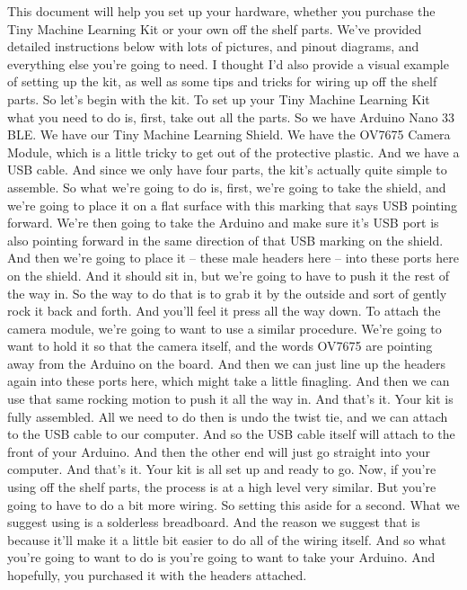 This document will help you set up your hardware, whether you purchase the Tiny Machine Learning Kit or your own off the shelf parts.
We've provided detailed instructions below with lots of pictures, and pinout diagrams, and everything else you're going to need.
I thought I'd also provide a visual example of setting up the kit, as well as some tips and tricks for wiring up off the shelf parts.
So let's begin with the kit.
To set up your Tiny Machine Learning Kit what you need to do is, first, take out all the parts.
So we have Arduino Nano 33 BLE.
We have our Tiny Machine Learning Shield.
We have the OV7675 Camera Module, which is a little tricky to get out of the protective plastic.
And we have a USB cable.
And since we only have four parts, the kit's actually quite simple to assemble.
So what we're going to do is, first, we're going to take the shield, and we're going to place it on a flat surface with this marking that says USB pointing forward.
We're then going to take the Arduino and make sure it's USB port is also pointing forward in the same direction of that USB marking on the shield.
And then we're going to place it -- these male headers here -- into these ports here on the shield.
And it should sit in, but we're going to have to push it the rest of the way in.
So the way to do that is to grab it by the outside and sort of gently rock it back and forth.
And you'll feel it press all the way down.
To attach the camera module, we're going to want to use a similar procedure.
We're going to want to hold it so that the camera itself, and the words OV7675 are pointing away from the Arduino on the board.
And then we can just line up the headers again into these ports here, which might take a little finagling.
And then we can use that same rocking motion to push it all the way in.
And that's it.
Your kit is fully assembled.
All we need to do then is undo the twist tie, and we can attach to the USB cable to our computer.
And so the USB cable itself will attach to the front of your Arduino.
And then the other end will just go straight into your computer.
And that's it.
Your kit is all set up and ready to go.
Now, if you're using off the shelf parts, the process is at a high level very similar.
But you're going to have to do a bit more wiring.
So setting this aside for a second.
What we suggest using is a solderless breadboard.
And the reason we suggest that is because it'll make it a little bit easier to do all of the wiring itself.
And so what you're going to want to do is you're going to want to take your Arduino.
And hopefully, you purchased it with the headers attached.
